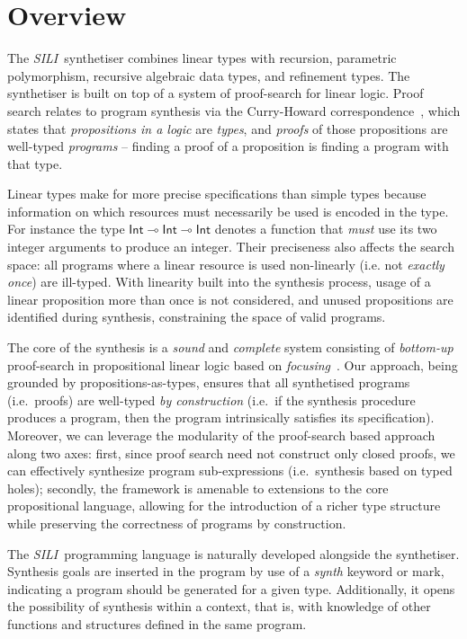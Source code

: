 \documentclass{llncs}
\newcommand{\lolli}{\multimap}
\newcommand{\synname}{\emph{SILI}}
\begin{document}
\section{Overview}\label{sec:overview}

The \synname\ synthetiser combines linear types with recursion,
parametric polymorphism, recursive algebraic data types, and
refinement types. The synthetiser is built on top of a system of proof-search for
linear logic. Proof search relates to program synthesis via the Curry-Howard
correspondence~\cite{}, which states that \emph{propositions in a logic} are
\emph{types}, and \emph{proofs} of those propositions are well-typed
\emph{programs} -- finding a proof of a proposition is finding a program with
that type.

Linear types make for more precise specifications than simple types
because information on which resources must necessarily be used is
encoded in the type. For instance the type $\mathsf{Int} \lolli
\mathsf{Int} \lolli \mathsf{Int}$ denotes a function that \emph{must}
use its two integer arguments to produce an integer.
Their preciseness also affects the search space:
all programs where a linear resource is used non-linearly (i.e. not
\emph{exactly once}) are ill-typed. With linearity built into the
synthesis process, usage of a linear proposition more than once is not
considered, and unused propositions are identified during synthesis,
constraining the space of valid programs.  %

The core of the synthesis is a \emph{sound} and \emph{complete} system
consisting of \emph{bottom-up} proof-search in propositional linear
logic based on \emph{focusing}~\cite{}. Our approach, being grounded
by propositions-as-types, ensures that all synthetised programs
(i.e.~proofs) are well-typed \emph{by construction} (i.e.~if the
synthesis procedure produces a program, then the program intrinsically
satisfies its specification). Moreover, we can leverage the modularity
of the proof-search based approach along two axes: first, since proof
search need not construct only closed proofs, we can effectively
synthesize program sub-expressions (i.e.~synthesis based on typed
holes); secondly, the framework is amenable to extensions to the core
propositional language, allowing for the introduction of a richer type
structure while preserving the correctness of programs by
construction.

The \synname\ programming language is naturally developed alongside
the synthetiser. Synthesis goals are inserted in the program by use of
a \emph{synth} keyword or mark, indicating a program should be
generated for a given type. Additionally, it opens the possibility of
synthesis within a context, that is, with knowledge of other functions and
structures defined in the same program.
\end{document}
